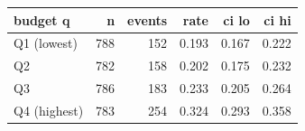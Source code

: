 \begin{tabular}{lrrrrr}
\toprule
budget q & n & events & rate & ci lo & ci hi \\
\midrule
Q1 (lowest) & 788 & 152 & 0.193 & 0.167 & 0.222 \\
Q2 & 782 & 158 & 0.202 & 0.175 & 0.232 \\
Q3 & 786 & 183 & 0.233 & 0.205 & 0.264 \\
Q4 (highest) & 783 & 254 & 0.324 & 0.293 & 0.358 \\
\bottomrule
\end{tabular}